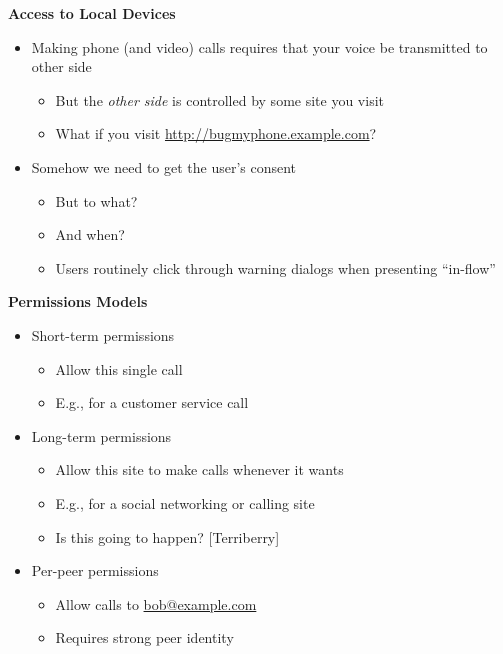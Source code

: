 \documentclass[helvetica]{seminar}
\newcommand{\heading}[1]{%
  \begin{center} 
    \large\bf 
    #1 
  \end{center} 
  \vspace{.4 in}}
\begin{document}
\begin{slide}
\heading{Access to Local Devices}

\vspace{-.2in}

\begin{itemize}
\item Making phone (and video) calls requires that your voice be transmitted to other side
  \begin{itemize}
  \item But the \emph{other side} is controlled by some site you visit
  \item What if you visit \url{http://bugmyphone.example.com}?
  \end{itemize}

\item Somehow we need to get the user's consent
  \begin{itemize}
  \item But to what?
  \item And when?
  \item Users routinely click through warning dialogs when presenting ``in-flow''
  \end{itemize}
\end{itemize}
\end{slide}


\begin{slide}
\heading{Permissions Models}

\begin{itemize}
\item Short-term permissions
\begin{itemize}
\item Allow this single call
\item E.g., for a customer service call
\end{itemize}

\item Long-term permissions
\begin{itemize}
\item Allow this site to make calls whenever it wants
\item E.g., for a social networking or calling site
\item Is this going to happen? [Terriberry]
\end{itemize}

\item Per-peer permissions
\begin{itemize}
\item Allow calls to \url{bob@example.com}
\item Requires strong peer identity
\end{itemize}
\end{itemize}
\end{slide}
\end{document}
